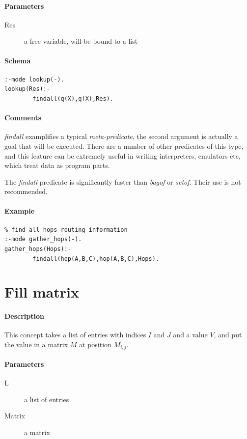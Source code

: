 \documentclass[a4paper,12pt]{report}
\begin{document}
\paragraph{Parameters}
\begin{description}
\item[Res] a free variable, will be bound to a list
\end{description}
\paragraph{Schema}
\begin{verbatim}
:-mode lookup(-).
lookup(Res):-
        findall(q(X),q(X),Res).
\end{verbatim}
\paragraph{Comments}
{\it findall} examplifies a typical {\it meta-predicate}, the second argument is actually a goal that will be executed. There are a number of other predicates of this type, and this feature can be extremely useful in writing interpreters, emulators etc, which treat data as program parts.

The {\it findall} predicate is significantly faster than {\it bagof} or {\it setof}. Their use is not recommended. 
\paragraph{Example}
\begin{verbatim}
% find all hops routing information
:-mode gather_hops(-).
gather_hops(Hops):-
        findall(hop(A,B,C),hop(A,B,C),Hops).
\end{verbatim}

\pagebreak
\section{Fill matrix}
\paragraph{Description}
This concept takes a list of entries with indices $I$ and $J$ and a value $V$, and put the value in a matrix $M$ at position $M_{i,j}$.
\paragraph{Parameters}
\begin{description}
\item[L] a list of entries
\item[Matrix] a matrix
\end{description}
\end{document}
